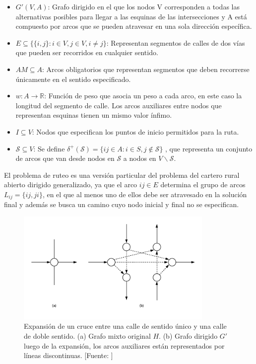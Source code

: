 \begin{itemize}
\item $G'(V, A)$: Grafo dirigido en el que los nodos V corresponden a todas las alternativas posibles para llegar a las esquinas de las intersecciones y A está compuesto por arcos que se pueden atravesar en una sola dirección específica.

\item $E \subseteq \{ \{i, j\}: i \in V, j \in V, i \neq j\}$: Representan segmentos de calles de dos vías que pueden ser recorridos en cualquier sentido.

\item $AM \subseteq A $: Arcos obligatorios que representan segmentos que deben recorrerse únicamente en el sentido especificado.

\item $w : A \rightarrow \mathbb{R} $: Función de peso que asocia un peso a cada arco, en este caso la longitud del segmento de calle. Los arcos auxiliares entre nodos que representan esquinas tienen un mismo valor ínfimo.

\item $I \subseteq V $: Nodos que especifican los puntos de inicio permitidos para la ruta.

\item $\mathcal{S} \subseteq V$: Se define $\delta^+ (\mathcal{S}) = \{i j \in A: i \in S , j \notin \mathcal{S} \}$ , que representa un conjunto de arcos que van desde nodos en $\mathcal{\mathcal{S}}$ a nodos en $V \backslash \mathcal{S}$.
\end{itemize}

El problema de ruteo es una versión particular del problema del cartero rural abierto dirigido generalizado, ya que el arco $i j \in E $ determina el grupo de arcos $L_{i j} = \{i j, j i\}$, en el que al menos uno de ellos debe ser atravesado en la solución final y además se busca un camino cuyo nodo inicial y final no se especifican.

\begin{figure}[tbp]
\centerline{\includegraphics[width=9.5cm]{expanded_graph.png}}
\caption{Expansión de un cruce entre una calle de sentido único y una calle de doble sentido. (a) Grafo mixto original $H$. (b) Grafo dirigido $G'$ luego de la expansión, los arcos auxiliares están representados por líneas discontinuas. [Fuente: \citet{Braier2017AnArgentina}]}
\label{fig:grafo_expandido}
\end{figure}

